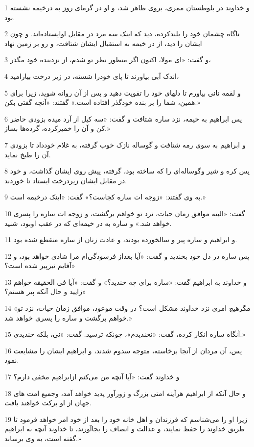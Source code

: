 \par 1 و خداوند در بلوطستان ممری، بروی ظاهر شد، و او در گرمای روز به درخیمه نشسته بود.
\par 2 ناگاه چشمان خود را بلندکرده، دید که اینک سه مرد در مقابل اوایستاده‌اند. و چون ایشان را دید، از در خیمه به استقبال ایشان شتافت، و رو بر زمین نهاد
\par 3 و گفت: «ای مولا، اکنون اگر منظور نظر تو شدم، از نزدبنده خود مگذر،
\par 4 اندک آبی بیاورند تا پای خودرا شسته، در زیر درخت بیارامید،
\par 5 و لقمه نانی بیاورم تا دلهای خود را تقویت دهید و پس از آن روانه شوید، زیرا برای همین، شما را بر بنده خودگذر افتاده است.» گفتند: «آنچه گفتی بکن.»
\par 6 پس ابراهیم به خیمه، نزد ساره شتافت و گفت: «سه کیل از آرد میده بزودی حاضر کن و آن را خمیرکرده، گرده‌ها بساز.»
\par 7 و ابراهیم به سوی رمه شتافت و گوساله نازک خوب گرفته، به غلام خودداد تا بزودی آن را طبخ نماید.
\par 8 پس کره و شیر وگوساله‌ای را که ساخته بود، گرفته، پیش روی ایشان گذاشت، و خود در مقابل ایشان زیردرخت ایستاد تا خوردند.
\par 9 به وی گفتند: «زوجه ات ساره کجاست؟» گفت: «اینک درخیمه است.»
\par 10 گفت: «البته موافق زمان حیات، نزد تو خواهم برگشت، و زوجه ات ساره را پسری خواهد شد.» و ساره به در خیمه‌ای که در عقب اوبود، شنید.
\par 11 و ابراهیم و ساره پیر و سالخورده بودند، و عادت زنان از ساره منقطع شده بود.
\par 12 پس ساره در دل خود بخندید و گفت: «آیا بعداز فرسودگی‌ام مرا شادی خواهد بود، و آقایم نیزپیر شده است؟»
\par 13 و خداوند به ابراهیم گفت: «ساره برای چه خندید؟» و گفت: «آیا فی الحقیقه خواهم زایید و حال آنکه پیر هستم؟»
\par 14 «مگرهیچ امری نزد خداوند مشکل است؟ در وقت موعود، موافق زمان حیات، نزد تو خواهم برگشت و ساره را پسری خواهد شد.»
\par 15 آنگاه ساره انکار کرده، گفت: «نخندیدم»، چونکه ترسید. گفت: «نی، بلکه خندیدی.»
\par 16 پس، آن مردان از آنجا برخاسته، متوجه سدوم شدند، و ابراهیم ایشان را مشایعت نمود.
\par 17 و خداوند گفت: «آیا آنچه من می‌کنم ازابراهیم مخفی دارم؟
\par 18 و حال آنکه از ابراهیم هرآینه امتی بزرگ و زورآور پدید خواهد آمد، وجمیع امت های جهان از او برکت خواهند یافت.
\par 19 زیرا او را می‌شناسم که فرزندان و اهل خانه خود را بعد از خود امر خواهد فرمود تا طریق خداوند را حفظ نمایند، و عدالت و انصاف را بجاآورند، تا خداوند آنچه به ابراهیم گفته است، به وی برساند.»
